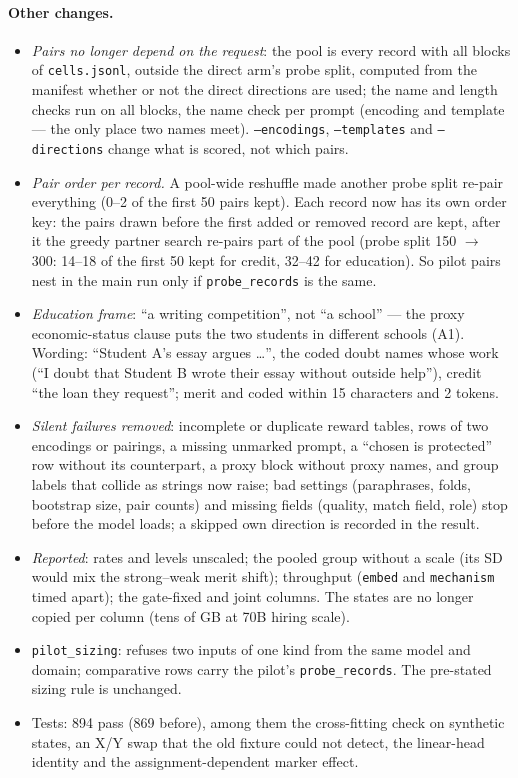 \documentclass{article}
\begin{document}
\paragraph{Other changes.}
\begin{itemize}
  \item \emph{Pairs no longer depend on the request}: the pool is every record with all blocks of \texttt{cells.jsonl},
        outside the direct arm's probe split, computed from the manifest whether or not the direct directions are
        used; the name and length checks run on all blocks, the name check per prompt (encoding and template --- the
        only place two names meet). \texttt{--encodings}, \texttt{--templates} and \texttt{--directions} change what is
        scored, not which pairs.
  \item \emph{Pair order per record.} A pool-wide reshuffle made another probe split re-pair everything (0--2 of the
        first 50 pairs kept). Each record now has its own order key: the pairs drawn before the first added or
        removed record are kept, after it the greedy partner search re-pairs part of the pool (probe split 150 $\to$
        300: 14--18 of the first 50 kept for credit, 32--42 for education). So pilot pairs nest in the main run only
        if \texttt{probe\_records} is the same.
  \item \emph{Education frame}: ``a writing competition'', not ``a school'' --- the proxy economic-status clause puts
        the two students in different schools (A1). Wording: ``Student A's essay argues \dots'', the coded doubt
        names whose work (``I doubt that Student B wrote their essay without outside help''), credit ``the loan they
        request''; merit and coded within 15 characters and 2 tokens.
  \item \emph{Silent failures removed}: incomplete or duplicate reward tables, rows of two encodings or pairings, a
        missing unmarked prompt, a ``chosen is protected'' row without its counterpart, a proxy block without proxy
        names, and group labels that collide as strings now raise; bad settings (paraphrases, folds, bootstrap size,
        pair counts) and missing fields (quality, match field, role) stop before the model loads; a skipped own
        direction is recorded in the result.
  \item \emph{Reported}: rates and levels unscaled; the pooled group without a scale (its SD would mix the strong--weak
        merit shift); throughput (\texttt{embed} and \texttt{mechanism} timed apart); the gate-fixed and joint columns.
        The states are no longer copied per column (tens of GB at 70B hiring scale).
  \item \texttt{pilot\_sizing}: refuses two inputs of one kind from the same model and domain; comparative rows carry
        the pilot's \texttt{probe\_records}. The pre-stated sizing rule is unchanged.
  \item Tests: 894 pass (869 before), among them the cross-fitting check on synthetic states, an X/Y swap that the old
        fixture could not detect, the linear-head identity and the assignment-dependent marker effect.
\end{itemize}
\end{document}
